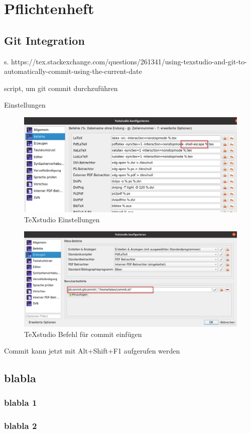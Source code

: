 \section{Pflichtenheft}
	\SecAuth{\emplLastA, \emplLastC} %
	
\subsection{Git Integration}
s. https://tex.stackexchange.com/questions/261341/using-texstudio-and-git-to-automatically-commit-using-the-current-date

\begin{longlisting}
	\caption{script, um git commit durchzuführen}
\end{longlisting}

Einstellungen
\begin{figure}[h] %
	\centering
	\includegraphics[width=0.6\linewidth]{chapter1/TeXstudio_Settings.png}
	\caption{TeXstudio Einstellungen}
\end{figure}

\begin{figure}[h] %
\centering
\includegraphics[width=0.6\linewidth]{chapter1/TeXstudio_AddCommand.png}
\caption{TeXstudio Befehl für commit einfügen}
\end{figure}

Commit kann jetzt mit Alt+Shift+F1 aufgerufen werden


\subsection{blabla}
\blindtext[1]

\subsubsection{blabla 1}
\blindtext[1]

\subsubsection{blabla 2}
\blindtext[1]

\pagebreak
